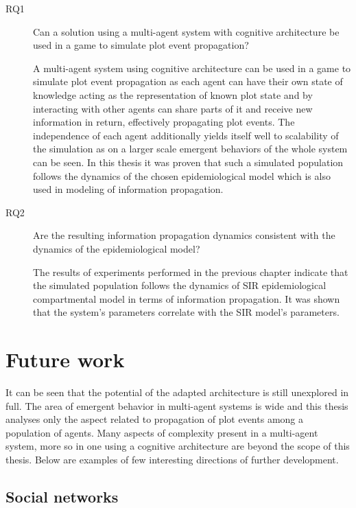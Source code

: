 \begin{description}
    \item[RQ1] Can a solution using a multi-agent system with cognitive architecture be used in a game to simulate plot event propagation?
    \item[] A multi-agent system using cognitive architecture can be used in a game to simulate plot event propagation as each agent can have their own state of knowledge acting as the representation of known plot state and by interacting with other agents can share parts of it and receive new information in return, effectively propagating plot events. The independence of each agent additionally yields itself well to scalability of the simulation as on a larger scale emergent behaviors of the whole system can be seen. In this thesis it was proven that such a simulated population follows the dynamics of the chosen epidemiological model which is also used in modeling of information propagation.
    \item[RQ2] Are the resulting information propagation dynamics consistent with the dynamics of the epidemiological model?
    \item[] The results of experiments performed in the previous chapter indicate that the simulated population follows the dynamics of SIR epidemiological compartmental model in terms of information propagation. It was shown that the system's parameters correlate with the SIR model's parameters.
\end{description}

\section{Future work}

It can be seen that the potential of the adapted architecture is still unexplored in full.
The area of emergent behavior in multi-agent systems is wide and this thesis analyses only the aspect related to propagation of plot events among a population of agents.
Many aspects of complexity present in a multi-agent system, more so in one using a cognitive architecture are beyond the scope of this thesis.
Below are examples of few interesting directions of further development.

\subsection{Social networks}

